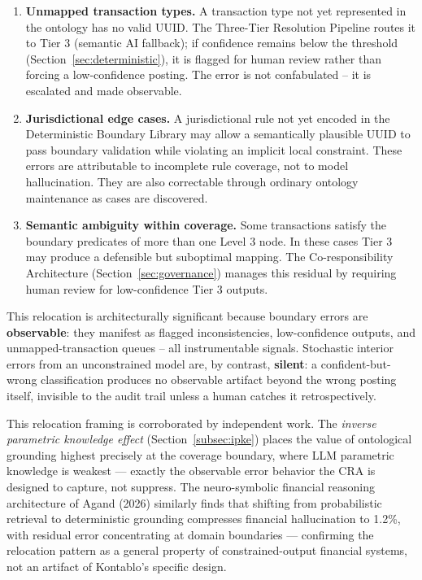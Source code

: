 \begin{enumerate}
    \item \textbf{Unmapped transaction types.} A transaction type not yet
    represented in the ontology has no valid UUID. The Three-Tier Resolution
    Pipeline routes it to Tier 3 (semantic AI fallback); if confidence remains
    below the threshold (Section~\ref{sec:deterministic}), it is flagged for human review rather than
    forcing a low-confidence posting. The error is not confabulated -- it is
    escalated and made observable.

    \item \textbf{Jurisdictional edge cases.} A jurisdictional rule not yet
    encoded in the Deterministic Boundary Library may allow a semantically
    plausible UUID to pass boundary validation while violating an implicit
    local constraint. These errors are attributable to incomplete rule coverage,
    not to model hallucination. They are also correctable through ordinary
    ontology maintenance as cases are discovered.

    \item \textbf{Semantic ambiguity within coverage.} Some transactions
    satisfy the boundary predicates of more than one Level 3 node. In these
    cases Tier 3 may produce a defensible but suboptimal mapping. The
    Co-responsibility Architecture (Section~\ref{sec:governance}) manages this residual by
    requiring human review for low-confidence Tier 3 outputs.
\end{enumerate}

This relocation is architecturally significant because boundary errors are
\textbf{observable}: they manifest as flagged inconsistencies, low-confidence
outputs, and unmapped-transaction queues -- all instrumentable signals.
Stochastic interior errors from an unconstrained model are, by contrast,
\textbf{silent}: a confident-but-wrong classification produces no observable
artifact beyond the wrong posting itself, invisible to the audit trail unless
a human catches it retrospectively.

This relocation framing is corroborated by independent work. The
\emph{inverse parametric knowledge effect} (Section~\ref{subsec:ipke}) places the
value of ontological grounding highest precisely at the coverage boundary, where
LLM parametric knowledge is weakest --- exactly the observable error behavior the
CRA is designed to capture, not suppress. The neuro-symbolic financial reasoning
architecture of Agand (2026) similarly finds that shifting from probabilistic
retrieval to deterministic grounding compresses financial hallucination to 1.2\%,
with residual error concentrating at domain boundaries --- confirming the
relocation pattern as a general property of constrained-output financial systems,
not an artifact of Kontablo's specific design.

